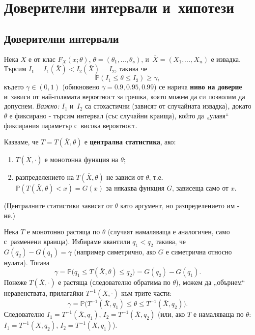 \chapter{Доверителни интервали и~хипотези}

\section{Доверителни интервали}

\begin{rembox}[Постановка]
Нека $X$ е от клас $F_X(x;\theta)$, $\theta=(\theta_1,\dots,\theta_s)$,
и~$\bar X=(X_1,\dots,X_n)$ е извадка. Търсим $I_1=I_1(\bar X) < I_2
(\bar X)=I_2$, такива че
\[
  \mathbb P(I_1\le\theta\le I_2) \ge \gamma,
\]
където $\gamma\in(0,1)$ (обикновено $\gamma=0.9,0.95,0.99$) се нарича
\textbf{ниво на доверие} и~зависи от най-голямата вероятност за
грешка, която можем да си позволим да допуснем. \emph{Важно:} $I_1$
и~$I_2$ са стохастични (зависят от случайната извадка), докато
$\theta$ е фиксирано - търсим интервал (със случайни краища), който
да „улавя“ фиксирания параметър с~висока вероятност.
\end{rembox}

\begin{defbox}
Казваме, че $T=T(\bar X,\theta)$ е \textbf{централна статистика},
ако:
\begin{enumerate}[label=\arabic*)]
  \item $T(\bar X,\cdot)$ е монотонна функция на $\theta$;
  \item разпределението на $T(\bar X,\theta)$ не зависи от $\theta$, т.е.\ $\mathbb P(T(\bar X,\theta)<x)=G(x)$ за някаква функция $G$, зависеща само от $x$.
\end{enumerate}
(Централните статистики зависят от $\theta$ като аргумент, но
разпределението им - не.)
\end{defbox}

\begin{rembox}
Нека $T$ е монотонно растяща по $\theta$ (случаят намаляваща е
аналогичен, само с~разменени краища). Избираме квантили $q_1<q_2$
такива, че $G(q_2)-G(q_1)=\gamma$ (например симетрично, ако $G$ е
симетрична относно нулата). Тогава
\[
  \gamma = \mathbb P\big(q_1\le T(\bar X,\theta)\le q_2\big) = G(q_2)-G(q_1).
\]
Понеже $T(\bar X,\cdot)$ е растяща (следователно обратима по
$\theta$), можем да „обърнем“ неравенствата, прилагайки $T^{-1}(
\bar X,\cdot)$ към трите части:
\[
  \gamma = \mathbb P\big(T^{-1}(\bar X,q_1) \le \theta \le T^{-1}(\bar X,q_2)\big).
\]
Следователно $I_1=T^{-1}(\bar X,q_1)$, $I_2=T^{-1}(\bar X,q_2)$ (или,
ако $T$ е намаляваща по $\theta$: $I_1=T^{-1}(\bar X,q_2)$,
$I_2=T^{-1}(\bar X,q_1)$).
\end{rembox}

